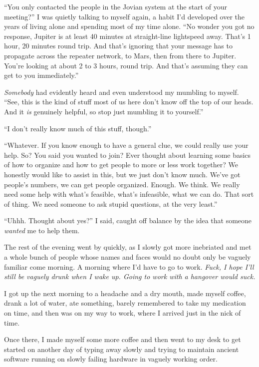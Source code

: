 \documentclass[a5paper]{report}%
\newcommand\spacer{{\center{$\cdots\\$}}}
\begin{document}
``You only contacted the people in the Jovian system at the start of your
meeting?'' I was quietly talking to myself again, a habit I'd developed over the
years of living alone and spending most of my time alone. ``No wonder you got no
response, Jupiter is at least 40 minutes at straight-line lightspeed away.
That's 1 hour, 20 minutes round trip. And that's ignoring that your message has
to propagate across the repeater network, to Mars, then from there to Jupiter.
You're looking at about 2 to 3 hours, round trip. And that's assuming they can
get to you immediately.''

\textit{Somebody} had evidently heard and even understood my mumbling to myself.
``See, this is the kind of stuff most of us here don't know off the top of our
heads. And it \textit{is} genuinely helpful, so stop just mumbling it to
yourself.''

``I don't really know much of this stuff, though.''

``Whatever. If you know enough to have a general clue, we could really use your
help. So? You said you wanted to join? Ever thought about learning some basics
of how to organize and how to get people to more or less work together? We
honestly would like to assist in this, but we just don't know much. We've got
people's numbers, we can get people organized. Enough. We think. We really
need some help with what's feasible, what's infeasible, what we can do. That
sort of thing. We need someone to ask stupid questions, at the very least.''

``Uhhh. Thought about yes?'' I said, caught off balance by the idea that someone
\textit{wanted} me to help them.

The rest of the evening went by quickly, as I slowly got more inebriated and met
a whole bunch of people whose names and faces would no doubt only be vaguely
familiar come morning. A morning where I'd have to go to work. \textit{Fuck, I
  hope I'll still be vaguely drunk when I wake up. Going to work with a
  hangover would suck.}

\spacer

I got up the next morning to a headache and a dry mouth, made myself coffee,
drank a lot of water, ate something, barely remembered to take my medication on
time, and then was on my way to work, where I arrived just in the nick of time.

Once there, I made myself some more coffee and then went to my desk to get
started on another day of typing away slowly and trying to maintain ancient
software running on slowly failing hardware in vaguely working order.


\end{document}
